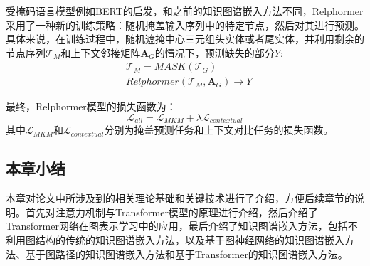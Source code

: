 受掩码语言模型例如BERT的启发，和之前的知识图谱嵌入方法不同，Relphormer采用了一种新的训练策略：随机掩盖输入序列中的特定节点，然后对其进行预测。具体来说，在训练过程中，随机遮掩中心三元组头实体或者尾实体，并利用剩余的节点序列$\mathcal{T}_M$和上下文邻接矩阵$\mathbf{A}_G$的情况下，预测缺失的部分$Y$:
\begin{equation}
  \begin{aligned}
    &\mathcal{T}_M = MASK(\mathcal{T}_G)\\
    &Relphormer(\mathcal{T}_M,\mathbf{A}_G)\rightarrow Y
  \end{aligned}
\end{equation}

最终，Relphormer模型的损失函数为：
\begin{equation}
  \mathcal{L}_{all} = \mathcal{L}_{MKM}+\lambda \mathcal{L}_{contextual}
\end{equation}
其中$\mathcal{L}_{MKM}$和$\mathcal{L}_{contextual}$分别为掩盖预测任务和上下文对比任务的损失函数。
\subsection{本章小结}

本章对论文中所涉及到的相关理论基础和关键技术进行了介绍，方便后续章节的说明。首先对注意力机制与Transformer模型的原理进行介绍，然后介绍了Transformer网络在图表示学习中的应用，最后介绍了知识图谱嵌入方法，包括不利用图结构的传统的知识图谱嵌入方法，以及基于图神经网络的知识图谱嵌入方法、基于图路径的知识图谱嵌入方法和基于Transformer的知识图谱嵌入方法。
